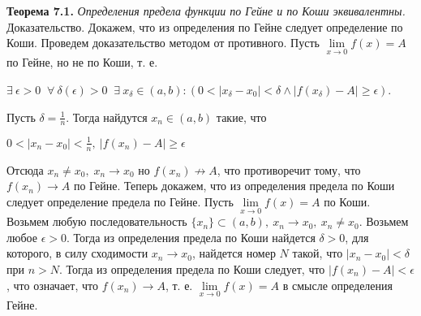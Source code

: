 \textbf{Теорема 7.1.} \textit{ Определения предела функции по Гейне и по Коши эквивалентны.}
\newline \indent Доказательство. Докажем, что из определения по
Гейне следует определение по Коши. Проведем доказательство методом от противного.
\newline Пусть $\lim\limits_{x\to 0} f(x)=A$ по Гейне, но не по Коши, т. е.
\newline
\newline
\centerline{$\exists \: \epsilon >0 \; \; \forall \: \delta (\epsilon) >0 \; \; \exists \: x_\delta \in (a, b) : (0<|x_\delta-x_0|<\delta \land |f(x_\delta)-A|\geq \epsilon)$.}
\newline
\newline Пусть $\delta = \frac{1}{n}$. Тогда найдутся $x_n \in (a, b)$ такие, что
\newline
\newline
\centerline{$0<|x_n-x_0|<\frac{1}{n}, \: |f(x_n)-A|\geq \epsilon$}
\newline
\newline
Отсюда $x_n \neq x_0, \; x_n \rightarrow x_0$ но $f(x_n) \nrightarrow A$, что противоречит тому, что $f(x_n) \rightarrow A$ по Гейне.
\newline \indent Теперь докажем, что из определения предела по Коши
следует определение предела по Гейне.
\newline \indent \vspace{2mm} Пусть $\lim\limits_{x\to 0} f(x)=A$ по Коши. Возьмем любую последовательность $\{x_n\} \subset (a, b), \: x_n \rightarrow x_0, \: x_n \neq x_0$. Возьмем любое $\epsilon > 0$. Тогда из определения предела по Коши найдется $\delta > 0$, для которого, в силу сходимости $x_n \rightarrow x_0$, найдется номер $N$ такой, что $|x_n-x_0| < \delta$ при $n > N$. Тогда из
определения предела по Коши следует, что $|f(x_n)-A| < \epsilon$,
что означает, что $f(x_n) \rightarrow A$, т. е. $\lim\limits_{x\to 0} f(x)=A$ в смысле определения Гейне.

